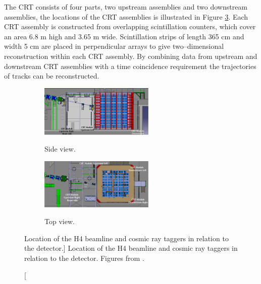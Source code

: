 The CRT consists of four parts, two upstream assemblies and two downstream
assemblies, the locations of the CRT assemblies is illustrated in Figure
\ref{fig:pdsp_CRT}. Each CRT assembly is constructed from overlapping 
scintillation counters, which cover an area 6.8 m high and 3.65 m wide. 
Scintillation strips of length 365 cm and width 5 cm are placed in 
perpendicular arrays to give two--dimensional reconstruction within each CRT 
assembly. By combining data from upstream and downstream CRT assemblies with a 
time coincidence requirement the trajectories of tracks can be reconstructed.

\begin{figure}

	\centering

	\begin{subfigure}[b]{\textwidth}
		\centering
		\includegraphics[width=0.6\textwidth]{figures/crt_side.pdf}
		\label{fig:crt_side}
		\caption{Side view.}
	\end{subfigure}

	\vspace{3mm}

	\begin{subfigure}[b]{\textwidth}
		\centering
		\includegraphics[width=0.6\textwidth]{figures/crt_top.pdf}
		\label{fig:crt_top}
		\caption{Top view.}
	\end{subfigure}

	\caption
	[Location of the H4 beamline and cosmic ray taggers in relation to the
	\protodune{} detector.]
	{Location of the H4 beamline and cosmic ray taggers in relation to the
	\protodune{} detector. Figures from \cite{protoduneperf}.}

	\label{fig:pdsp_CRT}

\end{figure}

